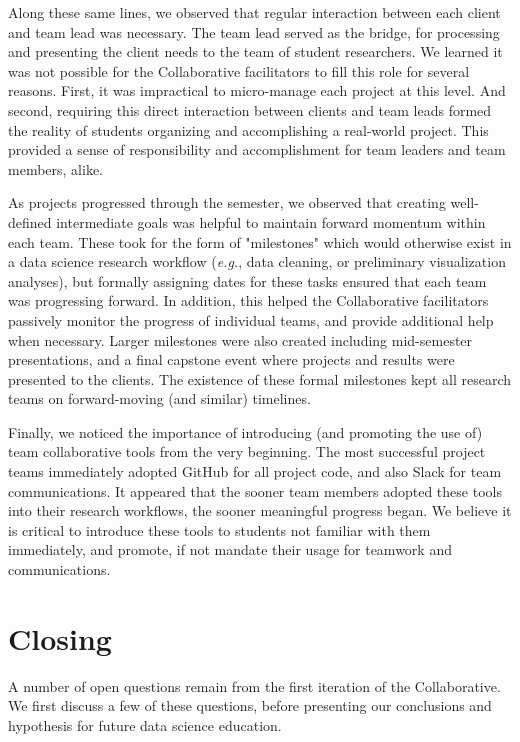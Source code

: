 \documentclass{sig-alternate}
\begin{document}
Along these same lines, we observed that regular interaction between each client and team lead was necessary. The team lead served as the bridge, for processing and presenting the client needs to the team of student researchers.  We learned it was not possible for the Collaborative facilitators to fill this role for several reasons.  First, it was impractical to micro-manage each project at this level.  And second, requiring this direct interaction between clients and team leads formed the reality of students organizing and accomplishing a real-world project.  This provided a sense of responsibility and accomplishment for team leaders and team members, alike.

As projects progressed through the semester, we observed that creating well-defined intermediate goals was helpful to maintain forward momentum within each team.  These took for the form of "milestones" which would otherwise exist in a data science research workflow (\emph{e.g.}, data cleaning, or preliminary visualization analyses), but formally assigning dates for these tasks ensured that each team was progressing forward.  In addition, this helped the Collaborative facilitators passively monitor the progress of individual teams, and provide additional help when necessary.  Larger milestones were also created including mid-semester presentations, and a final capstone event where projects and results were presented to the clients.  The existence of these formal milestones kept all research teams on forward-moving (and similar) timelines.

Finally, we noticed the importance of introducing (and promoting the use of) team collaborative tools from the very beginning.  The most successful project teams immediately adopted GitHub for all project code, and also Slack for team communications.  It appeared that the sooner team members adopted these tools into their research workflows, the sooner meaningful progress began.  We believe it is critical to introduce these tools to students not familiar with them immediately, and promote, if not mandate their usage for teamwork and communications.



\section{Closing}

A number of open questions remain from the first iteration of the Collaborative.  We first discuss a few of these questions, before presenting our conclusions and hypothesis for future data science education.
\end{document}
